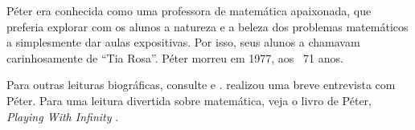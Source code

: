 \documentclass[../../../include/open-logic-section]{subfiles}
\begin{document}
P\'{e}ter era conhecida como uma professora de matemática apaixonada,
que preferia explorar com os alunos a natureza e a beleza dos problemas
matemáticos a simplesmente dar aulas expositivas. Por isso, seus alunos
a chamavam carinhosamente de ``Tia Rosa''. P\'eter morreu em 1977, aos
~71 anos.

\begin{reading}
Para outras leituras biográficas, consulte \citep{Oconnor2014} e
\citep{Andrasfai1986}. \citet{Tamassy1994} realizou uma breve entrevista
com P\'eter. Para uma leitura divertida sobre matemática, veja o livro
de P\'eter, \emph{Playing With Infinity} \citep{Peter2010}.
\end{reading}
\end{document}
